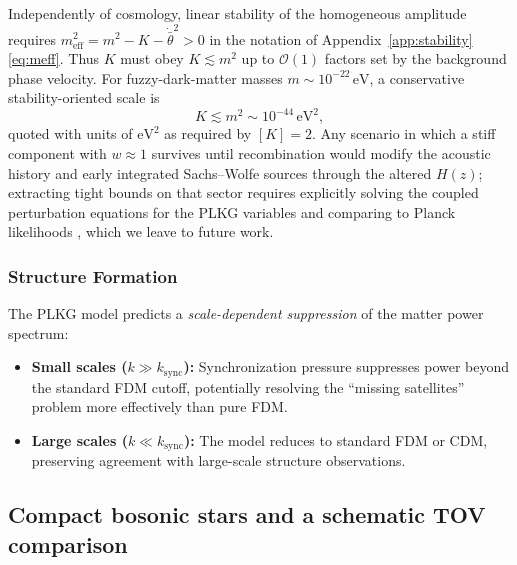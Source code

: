 Independently of cosmology, linear stability of the homogeneous amplitude requires $m_{\mathrm{eff}}^2=m^2-K-\dot{\bar{\theta}}^2>0$ in the notation of Appendix~\ref{app:stability} \eqref{eq:meff}.
Thus $K$ must obey $K\lesssim m^2$ up to $\mathcal{O}(1)$ factors set by the background phase velocity.
For fuzzy-dark-matter masses $m\sim 10^{-22}\,\mathrm{eV}$, a conservative stability-oriented scale is
\begin{equation}
K\lesssim m^2\sim 10^{-44}\,\mathrm{eV}^2,
\label{eq:K-stability-scale}
\end{equation}
quoted with units of $\mathrm{eV}^2$ as required by $[K]=2$.
Any scenario in which a stiff component with $w\approx 1$ survives until recombination would modify the acoustic history and early integrated Sachs--Wolfe sources through the altered $H(z)$; extracting tight bounds on that sector requires explicitly solving the coupled perturbation equations for the PLKG variables and comparing to Planck likelihoods \cite{Planck2018}, which we leave to future work.

\subsubsection{Structure Formation}
The PLKG model predicts a \emph{scale-dependent suppression} of the matter power spectrum:
\begin{itemize}
    \item \textbf{Small scales ($k \gg k_{\text{sync}}$):} Synchronization pressure suppresses power beyond the standard FDM cutoff, potentially resolving the ``missing satellites'' problem more effectively than pure FDM.
    \item \textbf{Large scales ($k \ll k_{\text{sync}}$):} The model reduces to standard FDM or CDM, preserving agreement with large-scale structure observations.
\end{itemize}

\subsection{Compact bosonic stars and a schematic TOV comparison}
\label{subsec:tov-compact}

